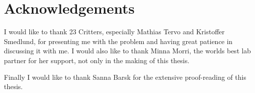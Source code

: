 \chapter{Acknowledgements}

I would like to thank 23 Critters, especially Mathias Tervo and Kristoffer Smedlund, for presenting me with the problem and having great patience in discussing it with me. I would also like to thank Minna Morri, the worlds best lab partner for her support, not only in the making of this thesis. 

Finally I would like to thank Sanna Barsk for the extensive proof-reading of this thesis. 

